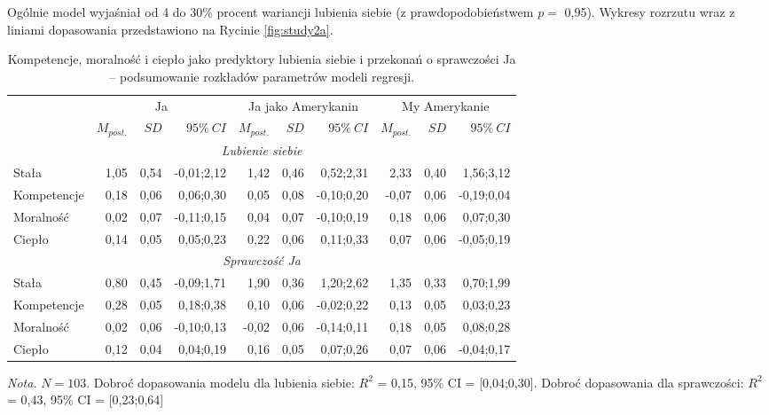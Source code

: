 \documentclass[man]{apa6}
\begin{document}
Ogólnie model wyjaśniał od 4 do 30\% procent wariancji lubienia siebie (z prawdopodobieństwem $p =$ 0,95). Wykresy rozrzutu wraz z liniami dopasowania przedstawiono na Rycinie \ref{fig:study2a}.\\

\begin{table*}[htbp]
\vspace*{2em}
\centering
\begin{threeparttable}
\caption{Kompetencje, moralność i ciepło jako predyktory lubienia siebie i przekonań o sprawczości Ja -- podsumowanie rozkładów parametrów modeli regresji.}
\label{tab:2}
\bgroup
\def\tabcolsep{4pt}
\begin{tabular}{lrrrrrrrrr}
\midrule
 &
\multicolumn{3}{c}{Ja} &
\multicolumn{3}{c}{Ja jako Amerykanin} &
\multicolumn{3}{c}{My Amerykanie} \\
\cline{2-10}
 & $M_{post.}$    & $SD$   & $95\%\ CI$   & $M_{post.}$    & $SD$   & $95\%\ CI$   & $M_{post.}$    & $SD$   & $95\%\ CI$   \\
\midrule
 \multicolumn{10}{c}{\emph{Lubienie siebie}}  \\
 Stała       &  1,05 & 0,54 & -0,01;2,12 &  1,42 & 0,46 &  0,52;2,31 &  2,33 & 0,40 &  1,56;3,12 \\
 Kompetencje &  0,18 & 0,06 &  0,06;0,30 &  0,05 & 0,08 & -0,10;0,20 & -0,07 & 0,06 & -0,19;0,04 \\
 Moralność   &  0,02 & 0,07 & -0,11;0,15 &  0,04 & 0,07 & -0,10;0,19 &  0,18 & 0,06 &  0,07;0,30 \\
 Ciepło      &  0,14 & 0,05 &  0,05;0,23 &  0,22 & 0,06 &  0,11;0,33 &  0,07 & 0,06 & -0,05;0,19 \\
 \multicolumn{10}{c}{\emph{Sprawczość Ja}}  \\
 Stała       &  0,80 & 0,45 & -0,09;1,71 &  1,90 & 0,36 &  1,20;2,62 &  1,35 & 0,33 &  0,70;1,99 \\
 Kompetencje &  0,28 & 0,05 &  0,18;0,38 &  0,10 & 0,06 & -0,02;0,22 &  0,13 & 0,05 &  0,03;0,23 \\
 Moralność   &  0,02 & 0,06 & -0,10;0,13 & -0,02 & 0,06 & -0,14;0,11 &  0,18 & 0,05 &  0,08;0,28 \\
 Ciepło      &  0,12 & 0,04 &  0,04;0,19 &  0,16 & 0,05 &  0,07;0,26 &  0,07 & 0,06 & -0,04;0,17 \\
\bottomrule
\end{tabular}
\egroup
\begin{tablenotes}
{\small
\textit{Nota.} $N = 103$. Dobroć dopasowania modelu dla lubienia siebie: $R^2$ = 0,15, 95\% CI = [0,04;0,30]. Dobroć dopasowania dla sprawczości: $R^2$ = 0,43, 95\% CI = [0,23;0,64]
}
\end{tablenotes}
\end{threeparttable}
\end{table*}
\end{document}
